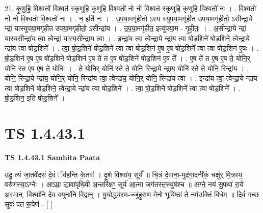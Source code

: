 \documentclass[17pt]{extarticle}
\begin{document}
21. कृ॒णु॒हि॒ वि॒श्वतो॑ वि॒श्वत॑ स्कृणुहि कृणुहि वि॒श्वतो॑ नो नो वि॒श्वत॑ स्कृणुहि कृणुहि वि॒श्वतो॑ नः । . वि॒श्वतो॑ नो नो वि॒श्वतो॑ वि॒श्वतो॑ नः । . न॒ इति॑ नः॒ । . उ॒प॒या॒मगृ॑हीतो ऽस्य स्युपया॒मगृ॑हीत उपया॒मगृ॑हीतो॒ ऽसीन्द्रा॒ये न्द्रा॑ यास्युपया॒मगृ॑हीत उपया॒मगृ॑हीतो॒ ऽसीन्द्रा॑य । . उ॒प॒या॒मगृ॑हीत॒ इत्यु॑पया॒म - गृ॒ही॒तः॒ । . अ॒सीन्द्रा॒ये न्द्रा॑ यास्य॒सीन्द्रा॑य त्वा॒ त्वेन्द्रा॑ यास्य॒सीन्द्रा॑य त्वा । . इन्द्रा॑य त्वा॒ त्वेन्द्रा॒ये न्द्रा॑य त्वा षोड॒शिने॑ षोड॒शिने॒ त्वेन्द्रा॒ये न्द्रा॑य त्वा षोड॒शिने᳚ । . त्वा॒ षो॒ड॒शिने॑ षोड॒शिने᳚ त्वा त्वा षोड॒शिन॑ ए॒ष ए॒ष षो॑ड॒शिने᳚ त्वा त्वा षोड॒शिन॑ ए॒षः । . षो॒ड॒शिन॑ ए॒ष ए॒ष षो॑ड॒शिने॑ षोड॒शिन॑ ए॒ष ते॑ त ए॒ष षो॑ड॒शिने॑ षोड॒शिन॑ ए॒ष ते᳚ । . ए॒ष ते॑ त ए॒ष ए॒ष ते॒ योनि॒र् योनि॑ स्त ए॒ष ए॒ष ते॒ योनिः॑ । . ते॒ योनि॒र् योनि॑ स्ते ते॒ योनि॒ रिन्द्रा॒ये न्द्रा॑य॒ योनि॑ स्ते ते॒ योनि॒ रिन्द्रा॑य । . योनि॒ रिन्द्रा॒ये न्द्रा॑य॒ योनि॒र् योनि॒ रिन्द्रा॑य त्वा॒ त्वेन्द्रा॑य॒ योनि॒र् योनि॒ रिन्द्रा॑य त्वा । . इन्द्रा॑य त्वा॒ त्वेन्द्रा॒ये न्द्रा॑य त्वा षोड॒शिने॑ षोड॒शिने॒ त्वेन्द्रा॒ये न्द्रा॑य त्वा षोड॒शिने᳚ । . त्वा॒ षो॒ड॒शिने॑ षोड॒शिने᳚ त्वा त्वा षोड॒शिने᳚ । . षो॒ड॒शिन॒ इति॑ षोड॒शिने᳚ । \newline
\pagebreak
{}
\section*{ TS 1.4.43.1 }

\textbf{TS 1.4.43.1 } \newline
\textbf{Samhita Paata} \newline

उदु॒ त्यं जा॒तवे॑दसं दे॒वं ॅव॑हन्ति के॒तवः॑ । दृ॒शे विश्वा॑य॒ सूर्यं᳚ ॥ चि॒त्रं दे॒वाना॒-मुद॑गा॒दनी॑कं॒ चक्षु॑र् मि॒त्रस्य॒ वरु॑णस्या॒ऽग्नेः । आऽप्रा॒ द्यावा॑पृथि॒वी अ॒न्तरि॑क्षꣳ॒॒ सूर्य॑ आ॒त्मा जग॑तस्त॒स्थुष॑श्च ॥ अग्ने॒ नय॑ सु॒पथा॑ रा॒ये अ॒स्मान्. विश्वा॑नि देव व॒युना॑नि वि॒द्वान् । यु॒यो॒द्ध्य॑स्म-ज्जु॑हुरा॒ण मेनो॒ भूयि॑ष्ठां ते॒ नम॑उक्तिं विधेम ॥ दिवं॑ गच्छ॒ सुवः॑ पत रू॒पेण॑ - [ ] \newline
\end{document}
